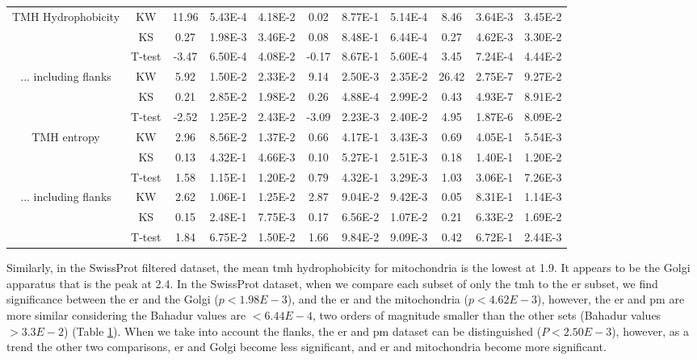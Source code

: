 \begin{table}[htbp]
\begin{tabular}{ccccccccccc}
        \midrule
        \multirow{3}[0]{*}{TMH Hydrophobicity} &  KW & 11.96 & 5.43E-4 & 4.18E-2 & 0.02  & 8.77E-1 & 5.14E-4 & 8.46  & 3.64E-3 & 3.45E-2 \\
                                &  KS & 0.27  & 1.98E-3 & 3.46E-2 & 0.08  & 8.48E-1 & 6.44E-4 & 0.27  & 4.62E-3 & 3.30E-2 \\
                                &  T-test & -3.47 & 6.50E-4 & 4.08E-2 & -0.17 & 8.67E-1 & 5.60E-4 & 3.45  & 7.24E-4 & 4.44E-2 \\
        \midrule
        \multirow{3}[0]{*}{... including flanks} &  KW & 5.92  & 1.50E-2 & 2.33E-2 & 9.14  & 2.50E-3 & 2.35E-2 & 26.42 & 2.75E-7 & 9.27E-2 \\
                                &  KS & 0.21  & 2.85E-2 & 1.98E-2 & 0.26  & 4.88E-4 & 2.99E-2 & 0.43  & 4.93E-7 & 8.91E-2 \\
                                &  T-test & -2.52 & 1.25E-2 & 2.43E-2 & -3.09 & 2.23E-3 & 2.40E-2 & 4.95  & 1.87E-6 & 8.09E-2 \\
      \midrule

        \multirow{3}[0]{*}{TMH entropy} &  KW & 2.96  & 8.56E-2 & 1.37E-2 & 0.66  & 4.17E-1 & 3.43E-3 & 0.69  & 4.05E-1 & 5.54E-3 \\
                                &  KS & 0.13  & 4.32E-1 & 4.66E-3 & 0.10  & 5.27E-1 & 2.51E-3 & 0.18 & 1.40E-1 & 1.20E-2 \\
                                &  T-test & 1.58  & 1.15E-1 & 1.20E-2 & 0.79  & 4.32E-1 & 3.29E-3 & 1.03 & 3.06E-1 & 7.26E-3 \\
        \midrule
        \multirow{3}[0]{*}{... including flanks} &  KW & 2.62  & 1.06E-1 & 1.25E-2 & 2.87  & 9.04E-2 & 9.42E-3 & 0.05 & 8.31E-1 & 1.14E-3 \\
                                &  KS & 0.15  & 2.48E-1 & 7.75E-3 & 0.17  & 6.56E-2 & 1.07E-2 & 0.21 & 6.33E-2 & 1.69E-2 \\
                                &  T-test & 1.84  & 6.75E-2 & 1.50E-2 & 1.66  & 9.84E-2 & 9.09E-3 & 0.42 & 6.72E-1 & 2.44E-3 \\
        \end{tabular}%
                        \label{table:organellesswissstats}
        \end{table}%

Similarly, in the SwissProt filtered dataset, the mean \gls{tmh} hydrophobicity for mitochondria is the lowest at 1.9.
It appears to be the Golgi apparatus that is the peak at 2.4.
In the SwissProt dataset, when we compare each subset of only the \gls{tmh} to the \gls{er} subset, we find significance between the \gls{er} and the Golgi ($p<1.98E-3$), and the \gls{er} and the mitochondria ($p<4.62E-3$), however, the \gls{er} and \gls{pm} are more similar considering the Bahadur values are $<6.44E-4$, two orders of magnitude smaller than the other sets (Bahadur values $>3.3E-2$) (Table \ref{table:organellesswissstats}).
When we take into account the flanks, the \gls{er} and \gls{pm} dataset can be distinguished ($P<2.50E-3$), however, as a trend the other two comparisons, \gls{er} and Golgi become less significant, and \gls{er} and mitochondria become more significant.

